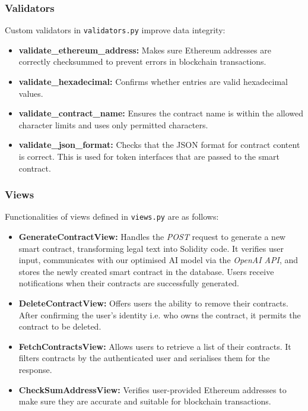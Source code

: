 \subsubsection{Validators}

Custom validators in \texttt{validators.py} improve data integrity:
\begin{itemize}
    \item \textbf{validate\_ethereum\_address:} Makes sure Ethereum addresses are correctly checksummed to prevent errors in blockchain transactions.
    \item \textbf{validate\_hexadecimal:} Confirms whether entries are valid hexadecimal values.
    \item \textbf{validate\_contract\_name:} Ensures the contract name is within the allowed character limits and uses only permitted characters.
    \item \textbf{validate\_json\_format:} Checks that the JSON format for contract content is correct. This is used for token interfaces that are passed to the smart contract.
\end{itemize}

\subsubsection{Views}

Functionalities of views defined in \texttt{views.py} are as follows:
\begin{itemize}
    \item \textbf{GenerateContractView:} Handles the \textit{POST} request to generate a new smart contract, transforming legal text into Solidity code. It verifies user input, communicates with our optimised AI model via the \textit{OpenAI API}, and stores the newly created smart contract in the database. Users receive notifications when their contracts are successfully generated.
    \item \textbf{DeleteContractView:} Offers users the ability to remove their contracts. After confirming the user's identity i.e. who owns the contract, it permits the contract to be deleted.
    \item \textbf{FetchContractsView:}  Allows users to retrieve a list of their contracts. It filters contracts by the authenticated user and serialises them for the response.
    \item \textbf{CheckSumAddressView:} Verifies user-provided Ethereum addresses to make sure they are accurate and suitable for blockchain transactions.
\end{itemize}


